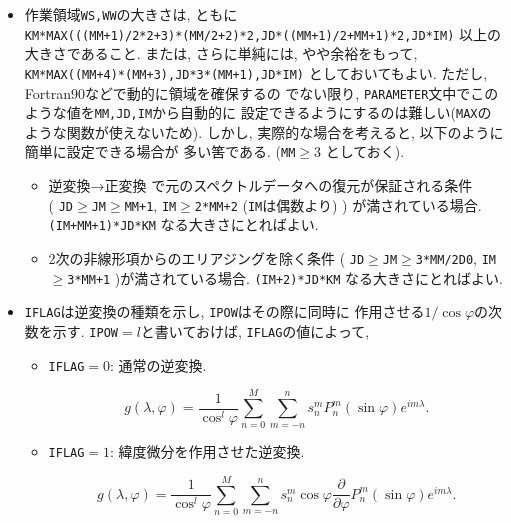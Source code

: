 \documentclass[a4j,fleqn]{jarticle}
\begin{document}
\begin{enumerate}
\begin{itemize}
\item 作業領域{\tt WS,WW}の大きさは, ともに\\
     {\tt KM*MAX(((MM+1)/2*2+3)*(MM/2+2)*2,JD*((MM+1)/2+MM+1)*2,JD*IM)}
    以上の大きさであること. または, さらに単純には, やや余裕をもって,
     {\tt KM*MAX((MM+4)*(MM+3),JD*3*(MM+1),JD*IM)}
    としておいてもよい. ただし, Fortran90などで動的に領域を確保するの
    でない限り, {\tt PARAMETER}文中でこのような値を{\tt MM,JD,IM}から自動的に
    設定できるようにするのは難しい({\tt MAX}のような関数が使えないため).
    しかし, 実際的な場合を考えると, 以下のように簡単に設定できる場合が
    多い筈である. ({\tt MM}$\ge 3$ としておく).

   \begin{itemize}
    \item 逆変換→正変換 で元のスペクトルデータへの復元が保証される条件\\
       ( {\tt JD}$\ge${\tt JM}$\ge${\tt MM+1}, 
        {\tt IM}$\ge${\tt 2*MM+2} ({\tt IM}は偶数より) )
       が満されている場合.
       {\tt (IM+MM+1)*JD*KM} なる大きさにとればよい.

    \item 2次の非線形項からのエリアジングを除く条件
       ( {\tt JD}$\ge${\tt JM}$\ge${\tt 3*MM/2D0}, 
       {\tt IM}$\ge${\tt 3*MM+1} )が満されている場合.
       {\tt (IM+2)*JD*KM} なる大きさにとればよい.

  \end{itemize}

\item {\tt IFLAG}は逆変換の種類を示し, {\tt IPOW}はその際に同時に
    作用させる$1/\cos\varphi$の次数を示す. {\tt IPOW}$=l$と書いておけば,
    {\tt IFLAG}の値によって,

   \begin{itemize}
    \item {\tt IFLAG}$=0$: 通常の逆変換.

      \begin{equation}
        g(\lambda,\varphi)=
	\frac1{\cos^l\varphi}\sum^M_{n=0}\sum^n_{m=-n}
        s^m_nP^m_n(\sin\varphi)e^{im\lambda}.
      \end{equation}

    \item {\tt IFLAG}$=1$: 緯度微分を作用させた逆変換.

      \begin{equation}
        g(\lambda,\varphi)=\frac1{\cos^l\varphi}\sum^M_{n=0}\sum^n_{m=-n}
        s^m_n\cos\varphi\frac{\partial}{\partial\varphi}P^m_n(\sin\varphi)
        e^{im\lambda}.
      \end{equation}


\end{itemize}
\end{itemize}
\end{enumerate}
\end{document}
